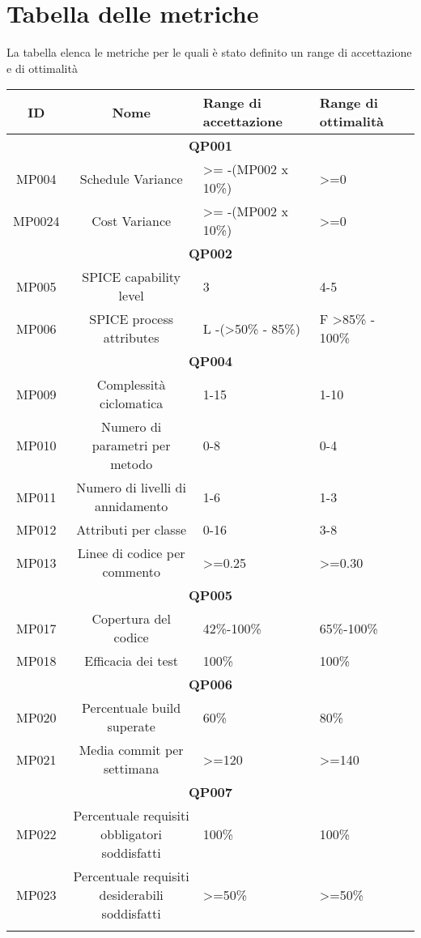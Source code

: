 \section{Tabella delle metriche}
\label{Tab2.2}
La tabella elenca le metriche per le quali è stato definito un range di accettazione e di ottimalità
\begin{tabularx}{\textwidth}{|c|c|X|X|}
	\hline 
	\textbf{ID} & \textbf{Nome} & \textbf{Range di accettazione}  & \textbf{Range di ottimalità}  \\ 
	\hline
	\multicolumn{4}{|c|}{\textbf{QP001}} \\
	\hline 
	MP004 & Schedule Variance & >= -(MP002 x 10\%) & >=0 \\ 
	\hline
	MP0024 &Cost Variance& >= -(MP002 x 10\%) & >=0 \\ 
	\hline
	\multicolumn{4}{|c|}{\textbf{QP002}} \\
	\hline
	MP005 & SPICE capability level & 3 & 4-5 \\ 
	\hline 
	MP006 & SPICE process attributes & L -(>50\% - 85\%)  & F >85\% - 100\% \\ 
	\hline
	\multicolumn{4}{|c|}{\textbf{QP004}} \\
	\hline
	MP009 & Complessità ciclomatica & 1-15 & 1-10 \\ 
	\hline 
	MP010 & Numero di parametri per metodo & 0-8 & 0-4 \\ 
	\hline 
	MP011 & Numero di livelli di annidamento & 1-6 & 1-3 \\ 
	\hline 
	MP012 & Attributi per classe & 0-16 & 3-8 \\ 
	\hline 
	MP013 & Linee di codice per commento & >=0.25 & >=0.30 \\ 
	\hline 
	\multicolumn{4}{|c|}{\textbf{QP005}} \\
	\hline
	MP017 & Copertura del codice & 42\%-100\% & 65\%-100\% \\ 
	\hline 
	MP018 & Efficacia dei test & 100\% & 100\% \\  
	\hline
	\multicolumn{4}{|c|}{\textbf{QP006}} \\
	\hline
	MP020 & Percentuale build superate& 60\% & 80\%\\
	\hline
	MP021 & Media commit per settimana & >=120 & >=140\\
	\hline
	\multicolumn{4}{|c|}{\textbf{QP007}} \\
	\hline
	MP022& \makecell{Percentuale requisiti \\ obbligatori soddisfatti}& 100\% & 100\% \\
	\hline
	MP023& \makecell{Percentuale requisiti \\ desiderabili soddisfatti}& >=50\% &>=50\%\\
	\hline
	\caption{Tabella delle metriche dei processi}
\end{tabularx}
